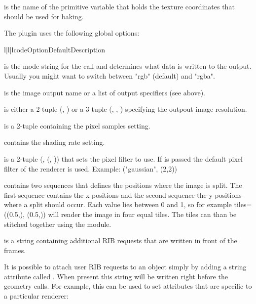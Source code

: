  is the name of the primitive variable that holds the 
texture coordinates that should be used for baking.

The plugin uses the following global options:

\begin{tableiii}{l|l|l}{code}{Option}{Default}{Description}
\end{tableiii}

 is the mode string for the  call
and determines what data is written to the output. Usually you might want
to switch between "rgb" (default) and "rgba".

 is the image output name or a list of output specifiers 
(see above).

 is either a 2-tuple (, ) or a 3-tuple 
(, , ) specifying the outpout
image resolution.

 is a 2-tuple containing the pixel samples setting.

 contains the shading rate setting.

 is a 2-tuple (, (, ))
that sets the pixel filter to use. If  is passed the default
pixel filter of the renderer is used. Example: ("gaussian", (2,2))

 contains two sequences that defines the positions where
the image is split. The first sequence contains the x positions and
the second sequence the y positions where a split should occur. Each
value lies between 0 and 1, so for example tiles=((0.5,), (0.5,)) will
render the image in four equal tiles. The tiles can than be stitched
together using the  module.

 is a string containing additional RIB requests that are written
in front of the frames.

It is possible to attach user RIB requests to an object simply by
adding a string attribute called . When present this string
will be written right before the geometry calls. For example, this
can be used to set attributes that are specific to a particular renderer:

